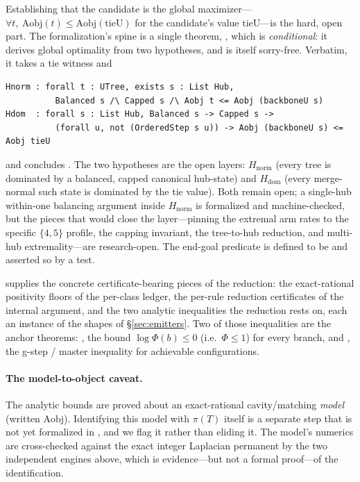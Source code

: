 Establishing that the candidate is the global maximizer---$\forall t,\ \mathrm{Aobj}(t)
\le \mathrm{Aobj}(\mathrm{tieU})$ for the candidate's value $\mathrm{tieU}$---is the
hard, open part. The formalization's spine is a single \Lean{} theorem,
, which is \emph{conditional}: it derives
global optimality from two hypotheses, and is itself sorry-free. Verbatim, it takes a
tie witness  and
\begin{lstlisting}
Hnorm : forall t : UTree, exists s : List Hub,
          Balanced s /\ Capped s /\ Aobj t <= Aobj (backboneU s)
Hdom  : forall s : List Hub, Balanced s -> Capped s ->
          (forall u, not (OrderedStep s u)) -> Aobj (backboneU s) <= Aobj tieU
\end{lstlisting}
and concludes . The two hypotheses are the
open layers: $H_{\mathrm{norm}}$ (every tree is dominated by a balanced, capped
canonical hub-state) and $H_{\mathrm{dom}}$ (every merge-normal such state is
dominated by the tie value). Both remain open; a single-hub within-one balancing
argument inside $H_{\mathrm{norm}}$ is formalized and machine-checked, but the pieces
that would close the layer---pinning the extremal arm rates to the specific
$\{4,5\}$ profile, the capping invariant, the tree-to-hub reduction, and multi-hub
extremality---are research-open. The end-goal predicate  is
defined to be  and asserted so by a test.

\Telperion{} supplies the concrete certificate-bearing pieces of the reduction: the
exact-rational positivity floors of the per-class ledger, the per-rule reduction
certificates of the internal argument, and the two analytic inequalities the
reduction rests on, each an instance of the shapes of \S\ref{sec:emitters}. Two of
those inequalities are the anchor theorems: , the bound
$\log\Phi(b) \le 0$ (i.e.\ $\Phi \le 1$) for every branch, and
, the g-step / master
inequality for achievable configurations.

\paragraph{The model-to-object caveat.} The analytic bounds are proved about an
exact-rational cavity/matching \emph{model} (written $\mathrm{Aobj}$). Identifying
this model with $\pi(T)$ itself is a separate step that is not yet formalized in
\Lean, and we flag it rather than eliding it. The model's numerics are cross-checked
against the exact integer Laplacian permanent by the two independent engines above,
which is evidence---but not a formal proof---of the identification.

